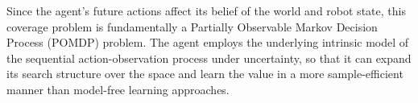 \documentclass{article}
\newcommand{\ph}[1]{{\textbf{#1}:}} %
\begin{document}
Since the agent's future actions affect its belief of the world and robot state, this coverage problem is fundamentally a Partially Observable Markov Decision Process (POMDP) problem.
The agent employs the underlying intrinsic model of the sequential action-observation process under uncertainty, so that it can %
expand its search structure over the space and learn the value in a more sample-efficient manner than model-free learning approaches.



\end{document}
